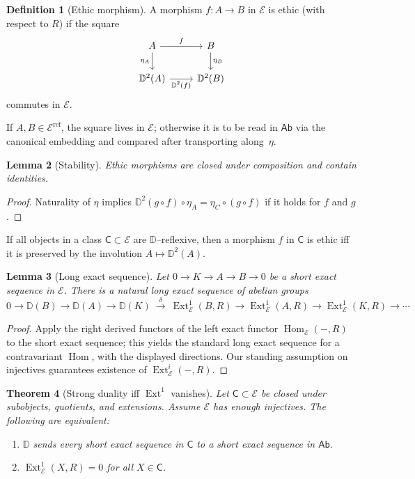 \documentclass[12pt]{article}
\newcommand{\E}{\mathcal{E}}
\newcommand{\Ab}{\mathsf{Ab}}
\newcommand{\DD}{\mathbb{D}}
\newcommand{\Hom}{\operatorname{Hom}}
\newcommand{\Ext}{\operatorname{Ext}}
\theoremstyle{plain}
\newtheorem{theorem}{Theorem}[section]
\newtheorem{lemma}[theorem]{Lemma}
\theoremstyle{definition}
\newtheorem{definition}[theorem]{Definition}
\theoremstyle{remark}
\numberwithin{equation}{section}
\begin{document}
\begin{definition}[Ethic morphism]
A morphism \(f:A\to B\) in \(\E\) is ethic (with respect to \(R\)) if the square
\[
\begin{tikzcd}
A \arrow[r,"f"] \arrow[d,"\eta_A"'] & B \arrow[d,"\eta_B"] \\
\DD^2(A) \arrow[r,"\DD^2(f)"'] & \DD^2(B)
\end{tikzcd}
\]
commutes in \(\E\).
\end{definition}

If $A,B\in \E^{\mathrm{ref}}$, the square lives in $\E$; otherwise it is to be read in $\Ab$ via the canonical embedding and compared after transporting along~$\eta$.

\begin{lemma}[Stability]
Ethic morphisms are closed under composition and contain identities.
\end{lemma}

\begin{proof}
Naturality of \(\eta\) implies \(\DD^2(g\circ f)\circ \eta_A=\eta_C\circ (g\circ f)\) if it holds for \(f\) and \(g\).
\end{proof}

If all objects in a class \(\mathsf{C}\subset \E\) are \(\DD\)--reflexive, then a morphism \(f\) in \(\mathsf{C}\) is ethic iff it is preserved by the involution \(A\mapsto \DD^2(A)\).

\begin{lemma}[Long exact sequence]\label{lem:les}
Let $0\to K\to A\to B\to 0$ be a short exact sequence in $\E$.
There is a natural long exact sequence of abelian groups
\[
0 \longrightarrow \DD(B) \longrightarrow \DD(A) \longrightarrow \DD(K)
\ \xrightarrow{\ \delta\ }\ 
\Ext^1_{\E}(B,R) \longrightarrow \Ext^1_{\E}(A,R)
\longrightarrow \Ext^1_{\E}(K,R) \longrightarrow \cdots
\]
\end{lemma}

\begin{proof}
Apply the right derived functors of the left exact functor $\Hom_\E(-,R)$ to the short exact sequence; this yields the standard long exact sequence for a contravariant $\Hom$, with the displayed directions. Our standing assumption on injectives guarantees existence of $\Ext^i_\E(-,R)$.
\end{proof}


\begin{theorem}[Strong duality iff $\Ext^1$ vanishes]\label{thm:exact-iff-ext}
Let $\mathsf{C}\subset \E$ be closed under subobjects, quotients, and extensions. Assume $\E$ has enough injectives. The following are equivalent:
\begin{enumerate}[label=(\alph*)]
\item \(\DD\) sends every short exact sequence in \(\mathsf{C}\) to a short exact sequence in \(\Ab\).
\item \(\Ext^1_{\E}(X,R)=0\) for all \(X\in \mathsf{C}\).
\end{enumerate}
\end{theorem}
\end{document}
